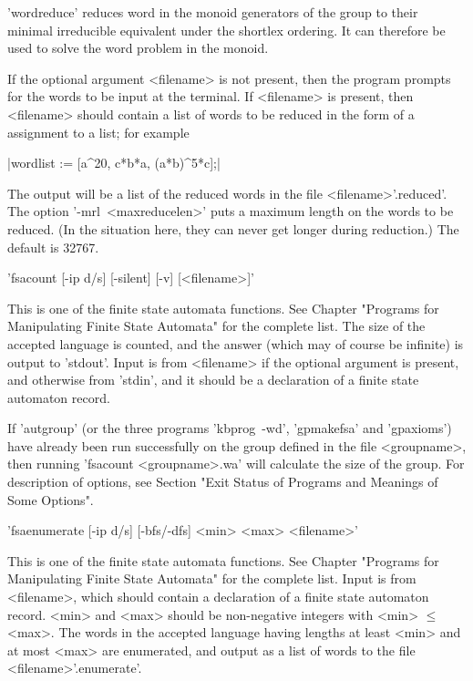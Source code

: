 'wordreduce' reduces word in the monoid generators of the group to their
minimal irreducible equivalent under the shortlex ordering.
It can therefore be used to solve the word problem in the
monoid.

If the optional argument <filename> is not present, then the program prompts
for the words to be input at the terminal. If <filename> is present, then
<filename> should contain a list of words to be reduced in the form of a
{\GAP} assignment to a list; for example\:

|wordlist := [a^20, c*b*a, (a*b)^5*c];|

The output will be a list of the reduced words in the file <filename>'.reduced'.
The option '-mrl\ <maxreducelen>' puts a maximum length on the words to
be reduced. (In the situation here, they can never get longer during reduction.)
The default is 32767.

'fsacount  [-ip d/s] [-silent] [-v] [<filename>]'

This is one of the finite state automata functions. See Chapter
"Programs for Manipulating Finite State Automata" for the complete list.
The size of the accepted language is counted, and the answer (which may
of course be infinite) is output to 'stdout'. Input is from <filename> if
the optional argument is present, and otherwise from 'stdin', and it
should be a declaration of a finite state automaton record.

If 'autgroup' (or the three programs 'kbprog\ -wd', 'gpmakefsa'
and 'gpaxioms') have already been run successfully on the group defined
in the file <groupname>, then running 'fsacount <groupname>.wa'
will calculate the size of the group.
For description of options, see Section
"Exit Status of Programs and Meanings of Some Options".


'fsaenumerate  [-ip d/s] [-bfs/-dfs] <min> <max> <filename>'

This is one of the finite state automata functions. See Chapter
"Programs for Manipulating Finite State Automata" for the complete list.
Input is from <filename>, which should contain a declaration of a finite
state automaton record.
<min> and <max> should be non-negative integers with <min> $\le$ <max>.
The words in the accepted language having lengths at least <min> and at
most <max> are enumerated, and output as a list of words to the file
<filename>'.enumerate'.

